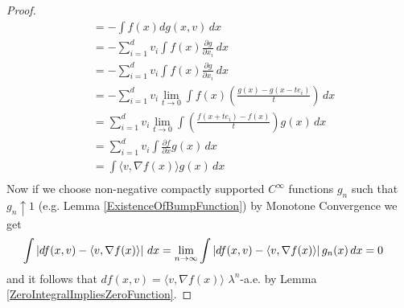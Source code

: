 \begin{proof}
\begin{align*}
&= - \int f(x)  dg(x,v) \, dx \\ 
&= - \sum_{i=1}^d v_i \int  f(x) \frac{\partial g}{\partial x_i} \, dx \\ 
&= - \sum_{i=1}^d v_i \int  f(x) \frac{\partial g}{\partial x_i} \, dx \\ 
&= - \sum_{i=1}^d v_i \lim_{t \to 0} \int  f(x) \left(\frac{g(x) - g(x-te_i)}{t} \right) \, dx \\ 
&= \sum_{i=1}^d v_i \lim_{t \to 0} \int \left( \frac{f(x+te_i) - f(x)}{t} \right) g(x) \, dx \\ 
&= \sum_{i=1}^d v_i \int \frac{\partial f}{\partial x} g(x) \, dx \\ 
&= \int \langle v, \nabla f(x) \rangle g(x) \, dx \\ 
\end{align*}
Now if we choose non-negative compactly supported $C^\infty$ functions $g_n$ such that $g_n \uparrow 1$ (e.g. Lemma \ref{ExistenceOfBumpFunction}) by Monotone Convergence we get
\begin{align*}
\int \left \vert df(x,v) - \langle v, \nabla f(x) \rangle \right \vert \, dx &= \lim_{n \to \infty} \int \left \vert df(x,v) - \langle v, \nabla f(x) \rangle \right \vert g_n(x) \, dx = 0
\end{align*}
and it follows that $df(x,v) = \langle v, \nabla f(x) \rangle$ $\lambda^n$-a.e. by Lemma \ref{ZeroIntegralImpliesZeroFunction}.


\end{proof}
